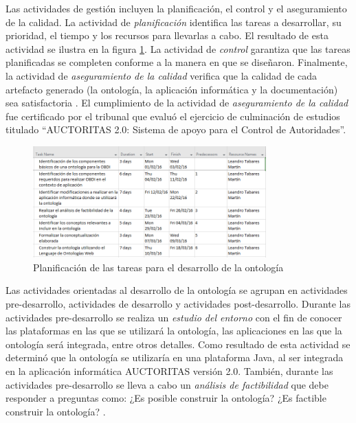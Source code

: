 Las actividades de gestión incluyen la planificación, el control y el aseguramiento de la calidad. La actividad de \textit{planificación} identifica las tareas a desarrollar, su prioridad, el tiempo y los recursos para llevarlas a cabo. El resultado de esta actividad se ilustra en la figura \ref{fig: planificacion}. La actividad de \textit{control} garantiza que las tareas planificadas se completen conforme a la manera en que se diseñaron. Finalmente, la actividad de \textit{aseguramiento de la calidad} verifica que la calidad de cada artefacto generado (la ontología, la aplicación informática y la documentación) sea satisfactoria \citep{Gomez-Perez:2007:OEE:1199560}. El cumplimiento de la actividad de \textit{aseguramiento de la calidad} fue certificado por el tribunal que evaluó el ejercicio de culminación de estudios titulado ``AUCTORITAS 2.0: Sistema de apoyo para el Control de Autoridades''.

\begin{figure}
\begin{center}
	\includegraphics[width=0.8\textwidth]{img/planificacionTareas.png}
\end{center}
\caption{Planificación de las tareas para el desarrollo de la ontología}
\label{fig: planificacion}
\end{figure}

Las actividades orientadas al desarrollo de la ontología se agrupan en actividades pre-desarrollo, actividades de desarrollo y actividades post-desarrollo. Durante las actividades pre-desarrollo se realiza un \textit{estudio del entorno} con el fin de conocer las plataformas en las que se utilizará la ontología, las aplicaciones en las que la ontología será integrada, entre otros detalles. Como resultado de esta actividad se determinó que la ontología se utilizaría en una plataforma Java, al ser integrada en la aplicación informática AUCTORITAS versión 2.0. También, durante las actividades pre-desarrollo se lleva a cabo un \textit{análisis de factibilidad} que debe responder a preguntas como: ¿Es posible construir la ontología? ¿Es factible construir la ontología? \citep{Gomez-Perez:2007:OEE:1199560}.

